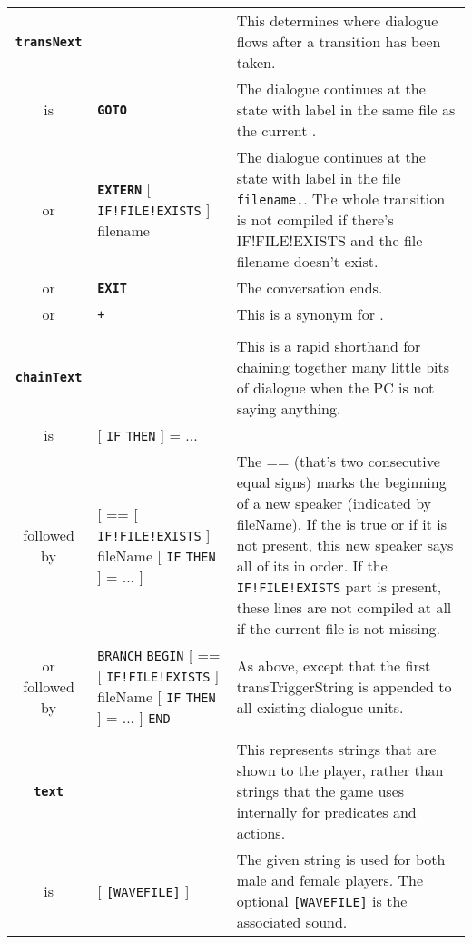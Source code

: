 \documentclass{article}
\def\ttref#1{\ahrefloc{#1}{\tt #1}}
\def\DEFINE#1{{\tt \bf #1}\label{#1}\index{#1}}
\def\t#1{{\tt #1}}
\def\Ob{{\color{red} [ }}
\def\Oe{{\color{red} ] }}
\begin{document}
\begin{tabular}{cp{10in}|p{10in}}
\\

\DEFINE{transNext} & & This determines where dialogue flows after a
transition has been taken. \\
is & \DEFINE{GOTO} \ttref{stateLabel} &
  The dialogue continues at the state with label \ttref{stateLabel} in the
  same \ttref{DLG} file as the current \ttref{state}. \\
or & \DEFINE{EXTERN} \Ob \t{IF!FILE!EXISTS} \Oe filename \ttref{stateLabel} &
  The dialogue continues at the state with label \ttref{stateLabel} in the
  file \t{filename.}\ttref{DLG}. The whole transition is not compiled if there's
  IF!FILE!EXISTS and the file filename doesn't exist. \\
or & \DEFINE{EXIT} &
  The conversation ends. \\
or & \t{+} \ttref{stateLabel} &
  This is a synonym for \ttref{GOTO}. \\

\\

\DEFINE{chainText} & & This is a rapid shorthand for chaining together many
little bits of dialogue when the PC is not saying anything. \\
is & \Ob \t{IF} \ttref{transTriggerString} \t{THEN} \Oe \ttref{sayText} 
      = \ttref{sayText} ... & \\
followed by &
      \Ob == \Ob \t{IF!FILE!EXISTS} \Oe fileName
      \Ob \t{IF} \ttref{transTriggerString} \t{THEN} \Oe \ttref{sayText}
      = \ttref{sayText} ... \Oe &
      The == (that's two consecutive equal signs) marks the beginning of a
      new speaker (indicated by fileName).  If the
      \ttref{transTriggerString} is true or if it is not present, this new
      speaker says all of its \ttref{sayText} in order. If the \t{IF!FILE!EXISTS}
      part is present, these lines are not compiled at all if the current file is
      not missing.
      \\
or followed by &
    \t{BRANCH} \ttref{transTriggerString} \t{BEGIN}
      \Ob == \Ob \t{IF!FILE!EXISTS} \Oe fileName
      \Ob \t{IF} \ttref{transTriggerString} \t{THEN} \Oe \ttref{sayText}
      = \ttref{sayText} ... \Oe
    \t{END} &
      As above, except that the first transTriggerString is appended to all
      existing dialogue units.\\
\\

\DEFINE{text} & & This represents strings that are shown to the player,
rather than strings that the game uses internally for predicates and
actions. \\
is & \ttref{String} \Ob \t{[WAVEFILE]} \Oe & The given string is used for both male and
female players. The optional \t{[WAVEFILE]} is the associated sound. \\


\end{tabular}
\end{document}
